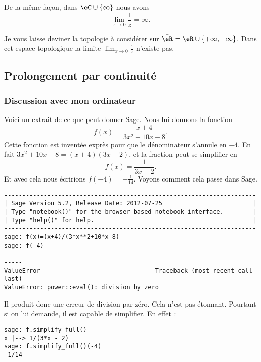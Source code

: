 De la même façon, dans \( \eC\cup\{ \infty \}\) nous avons
\begin{equation}
	\lim_{z\to 0} \frac{1}{ z }=\infty.
\end{equation}

\begin{normaltext}
	Je vous laisse deviner la topologie à considérer sur \( \bar \eR=\eR\cup\{ +\infty,-\infty \}\). Dans cet espace topologique la limite \( \lim_{x\to 0} \frac{1}{ x }\) n'existe pas.
\end{normaltext}

\subsection{Prolongement par continuité}

\subsubsection{Discussion avec mon ordinateur}

Voici un extrait de ce que peut donner Sage. Nous lui donnons la fonction
\begin{equation}    \label{EqyEHTBZ}
	f(x)=\frac{ x+4 }{ 3x^2+10x-8 }.
\end{equation}
Cette fonction est inventée exprès pour que le dénominateur s'annule en \( -4\). En fait \( 3x^2+10x-8=(x+4)(3x-2)\), et la fraction peut se simplifier en
\begin{equation}
	f(x)=\frac{1}{ 3x-2 }.
\end{equation}
Et avec cela nous écririons \( f(-4)=-\frac{1}{ 14 }\). Voyons comment cela passe dans Sage.

\begin{verbatim}
----------------------------------------------------------------------
| Sage Version 5.2, Release Date: 2012-07-25                         |
| Type "notebook()" for the browser-based notebook interface.        |
| Type "help()" for help.                                            |
----------------------------------------------------------------------
sage: f(x)=(x+4)/(3*x**2+10*x-8)
sage: f(-4)
---------------------------------------------------------------------------
ValueError                                Traceback (most recent call last)
ValueError: power::eval(): division by zero
\end{verbatim}
Il produit donc une erreur de division par zéro. Cela n'est pas étonnant. Pourtant si on lui demande, il est capable de simplifier. En effet :
\begin{verbatim}
sage: f.simplify_full()
x |--> 1/(3*x - 2)
sage: f.simplify_full()(-4)
-1/14
\end{verbatim}

